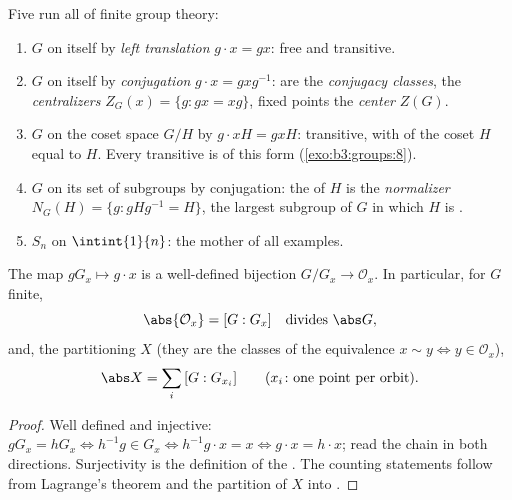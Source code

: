 \begin{example}\label{ex:b3:groups:actions}
Five  run all of finite group theory:
\begin{enumerate}
  \item $G$ on itself by \emph{left translation} $g \cdot x = gx$:
        free and transitive.
  \item $G$ on itself by \emph{conjugation} $g \cdot x = gxg^{-1}$:
         are the \emph{conjugacy classes},  the \emph{centralizers}
         $Z_G(x) = \{g : gx = xg\}$, fixed
        points the \emph{center} $Z(G)$.
  \item $G$ on the coset space $G/H$ by $g \cdot xH = gxH$:
        transitive, with  of the coset $H$ equal to $H$.
        Every transitive  is of this form
        (\cref{exo:b3:groups:8}).
  \item $G$ on its set of subgroups by conjugation: the 
        of $H$ is the \emph{normalizer} $N_G(H) =
        \{g : gHg^{-1} = H\}$, the largest subgroup of $G$ in which
        $H$ is .
  \item $S_n$ on $\intint{1}{n}$: the mother of all examples.
\end{enumerate}
\end{example}

\begin{theorem}\label{thm:b3:groups:orbitstab}
The map $gG_x \mapsto g \cdot x$ is a well-defined bijection
$G/G_x \to \mathcal O_x$. In particular, for $G$
finite,
\[
\abs{\mathcal O_x} = [G : G_x] \quad\text{divides } \abs G,
\]
and, the  partitioning $X$ (they are the classes of the
equivalence $x \sim y \iff y \in \mathcal O_x$),
\[
\abs X = \sum_{i} \,[G : G_{x_i}]
\qquad (x_i\colon \text{one point per orbit}).
\]
\end{theorem}

\begin{proof}
Well defined and injective: $gG_x = hG_x \iff h^{-1}g \in G_x \iff
h^{-1}g \cdot x = x \iff g \cdot x = h \cdot x$; read the chain in
both directions. Surjectivity is the definition of the . The
counting statements follow from Lagrange's theorem and the
partition of $X$ into .
\end{proof}

